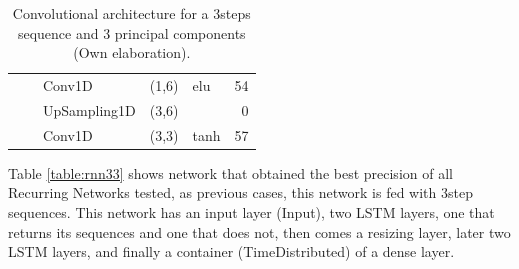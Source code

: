 \begin{table}[H]
\begin{center}
\begin{tabular}{ll|l|r|l|r|}
\multicolumn{1}{|l|}{}                              &                             & Conv1D                             & (1,6)                                & elu                                     & 54                                          \\ \cline{3-6} 
\multicolumn{1}{|l|}{}                              &                             & UpSampling1D                       & (3,6)                                &                                          & 0                                           \\ \cline{3-6} 
\multicolumn{1}{|l|}{}                              &                             & Conv1D                             & \multicolumn{1}{l|}{(3,3)}           & tanh                                     & 57                                          \\ \hline
\end{tabular}
\end{center}
\caption{Convolutional architecture for a 3\-steps sequence and 3 principal components (Own elaboration).}
\label{table:cnn33}
\end{table}

Table \ref{table:rnn33} shows network that obtained the best precision of all Recurring Networks tested, as previous cases, this network is fed with 3\-step sequences. This network has an input layer (Input), two LSTM layers, one that returns its sequences and one that does not, then comes a resizing layer, later two LSTM layers, and finally a container (TimeDistributed) of a dense layer.

